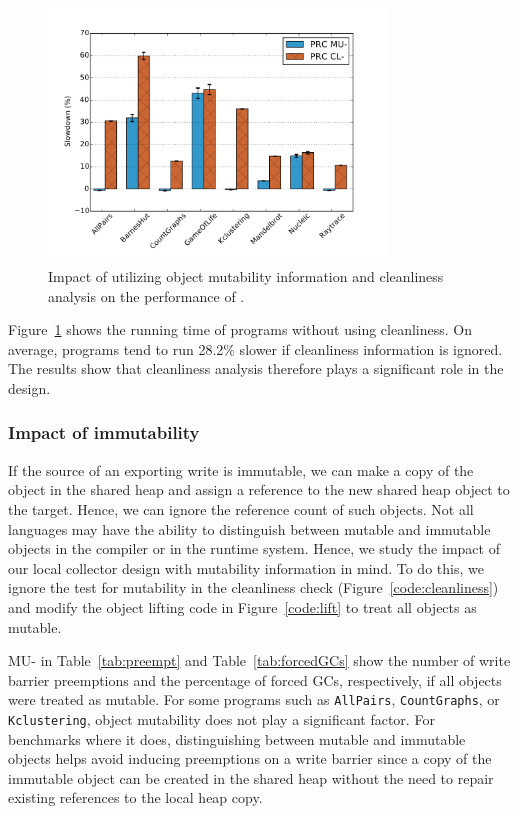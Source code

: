 \begin{figure}[t]
  \centering
  \includegraphics[width=0.8\textwidth]{Graphs/slowdown_cleanliness}
	\caption{Impact of utilizing object mutability information and cleanliness
	analysis on the performance of \prc.}
  \label{fig:slowdown-cleanliness}
\end{figure}

Figure~\ref{fig:slowdown-cleanliness} shows the running time of programs
without using cleanliness. On average, programs tend to run 28.2\% slower if
cleanliness information is ignored. The results show that cleanliness analysis
therefore plays a significant role in the \prc design.

\subsubsection{Impact of immutability}

If the source of an exporting write is immutable, we can make a copy of the
object in the shared heap and assign a reference to the new shared heap object
to the target. Hence, we can ignore the reference count of such objects. Not
all languages may have the ability to distinguish between mutable and immutable
objects in the compiler or in the runtime system. Hence, we study the impact of
our local collector design with mutability information in mind.  To do this, we
ignore the test for mutability in the cleanliness check
(Figure~\ref{code:cleanliness}) and modify the object lifting code in
Figure~\ref{code:lift} to treat all objects as mutable.

\prc MU- in Table~\ref{tab:preempt} and Table~\ref{tab:forcedGCs} show the
number of write barrier preemptions and the percentage of forced GCs,
respectively, if all objects were treated as mutable.  For some programs such
as {\tt AllPairs}, {\tt CountGraphs}, or {\tt Kclustering}, object mutability
does not play a significant factor.  For benchmarks where it does,
distinguishing between mutable and immutable objects helps avoid inducing
preemptions on a write barrier since a copy of the immutable object can be
created in the shared heap without the need to repair existing references to
the local heap copy.

